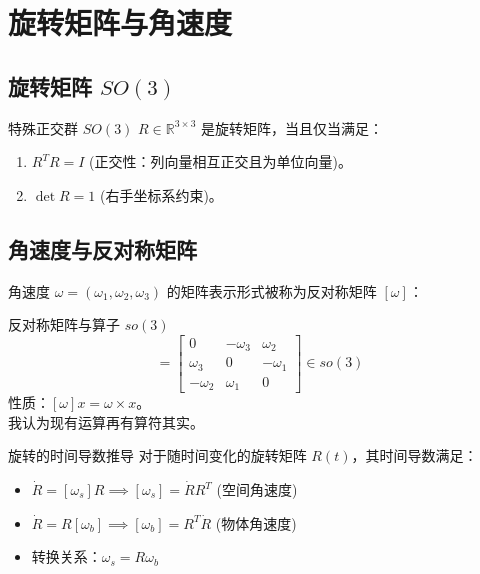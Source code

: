 \section{旋转矩阵与角速度}
\subsection{旋转矩阵 $SO(3)$}
\begin{defbox}{特殊正交群 $SO(3)$}
$R \in \mathbb{R}^{3 \times 3}$ 是旋转矩阵，当且仅当满足：
\begin{enumerate}
    \item $R^T R = I$ (正交性：列向量相互正交且为单位向量)。
    \item $\det R = 1$ (右手坐标系约束)。
\end{enumerate}
\end{defbox}


\subsection{角速度与反对称矩阵}
角速度 $\omega = (\omega_1, \omega_2, \omega_3)$ 的矩阵表示形式被称为反对称矩阵 $[\omega]$：
\begin{formulabox}{反对称矩阵与算子 $so(3)$}
\begin{equation}
[\omega] = \begin{bmatrix} 0 & -\omega_3 & \omega_2 \\ \omega_3 & 0 & -\omega_1 \\ -\omega_2 & \omega_1 & 0 \end{bmatrix} \in so(3)
\end{equation}
性质：$[\omega]x = \omega \times x$。\\
我认为现有运算再有算符其实。
\end{formulabox}

\begin{mybox}{旋转的时间导数推导}
对于随时间变化的旋转矩阵 $R(t)$，其时间导数满足：
\begin{itemize}
    \item $\dot{R} = [\omega_s] R \implies [\omega_s] = \dot{R}R^T$ (空间角速度)
    \item $\dot{R} = R [\omega_b] \implies [\omega_b] = R^T \dot{R}$ (物体角速度)
    \item 转换关系：$\omega_s = R \omega_b$ 
\end{itemize}
\end{mybox}

